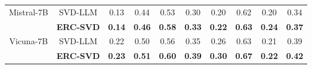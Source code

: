 \begin{figure}[t]
\begin{minipage}[t]{0.61\textwidth}
{\begin{tabular}{c|c|cccccccc}
    \midrule
        \multirow{2}{*}{Mistral-7B}
              
                               & \cellcolor{white} SVD-LLM & \cellcolor{white} 0.13 & \cellcolor{white} 0.44 & \cellcolor{white} 0.53 & \cellcolor{white} 0.30 & \cellcolor{white} 0.20 & \cellcolor{white} 0.62 & \cellcolor{white} 0.20 & \cellcolor{white} 0.34\\
        \cmidrule{2-10}
                               & \cellcolor{cyan!10} \textbf{ERC-SVD} & \cellcolor{cyan!10} \textbf{0.14} & \cellcolor{cyan!10} \textbf{0.46} & \cellcolor{cyan!10} \textbf{0.58} & \cellcolor{cyan!10} \textbf{0.33} & \cellcolor{cyan!10} \textbf{0.22} & \cellcolor{cyan!10} \textbf{0.63} & \cellcolor{cyan!10} \textbf{0.24} & \cellcolor{cyan!10} \textbf{0.37}\\
    \midrule
        \multirow{2}{*}{Vicuna-7B}
              
                               & \cellcolor{white} SVD-LLM & \cellcolor{white} 0.22 & \cellcolor{white} 0.50 & \cellcolor{white} 0.56 & \cellcolor{white} 0.35 & \cellcolor{white} 0.26 & \cellcolor{white} 0.63 & \cellcolor{white} 0.21 & \cellcolor{white} 0.39\\
        \cmidrule{2-10}
                               & \cellcolor{cyan!10} \textbf{ERC-SVD} & \cellcolor{cyan!10} \textbf{0.23} & \cellcolor{cyan!10} \textbf{0.51} & \cellcolor{cyan!10} \textbf{0.60} & \cellcolor{cyan!10} \textbf{0.39} & \cellcolor{cyan!10} \textbf{0.30} & \cellcolor{cyan!10} \textbf{0.67} & \cellcolor{cyan!10} \textbf{0.22} & \cellcolor{cyan!10} \textbf{0.42}\\
    \bottomrule
\end{tabular}
    }
  \end{minipage}%
  \hfill
  \begin{minipage}[t]{0.34\textwidth}
    \centering
    \vspace{1pt}
    \label{pruning_comparision}
    \small
  \end{minipage}
\end{figure}

